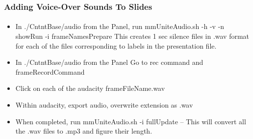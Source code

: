 \begin{comment}
*****  [[elisp:(org-cycle)][| ]]  [[elisp:(blee:ppmm:org-mode-toggle)][Nat]] [[elisp:(beginning-of-buffer)][Top]] [[elisp:(delete-other-windows)][(1)]] || /Frame/ *Label=AddingVoice-OverSoundsToSlides*  Adding Voice-Over Sounds To Slides ::  [[elisp:(org-cycle)][| ]]
\end{comment}

\begin{frame}[fragile,label=AddingVoice-OverSoundsToSlides]
    \frametitle{Adding Voice-Over Sounds To Slides}
    \framesubtitle{}

\begin{itemize}
\item In ./CntntBase/audio from the Panel, run  mmUniteAudio.sh -h -v -n showRun -i frameNamesPrepare
  This creates 1 sec silence files in .wav format for each of the files corresponding to labels
  in the presentation file.
\item In ./CntntBase/audio from the Panel Go to rec command and frameRecordCommand
\item Click on each of the audacity frameFileName.wav
\item Within audacity, export audio, overwrite extension as .wav
\item When completed, run  mmUniteAudio.sh -i fullUpdate -- This will convert all the .wav files to .mp3 and 
  figure their length.
\end{itemize}

\end{frame}

\begin{comment}
*      ================
*  [[elisp:(org-cycle)][| ]] [[elisp:(org-show-subtree)][|=]] [[elisp:(show-children 10)][|V]] [[elisp:(bx:orgm:indirectBufOther)][|>]] [[elisp:(bx:orgm:indirectBufMain)][|I]] [[elisp:(blee:ppmm:org-mode-toggle)][|N]] [[elisp:(org-top-overview)][|O]] [[elisp:(progn (org-shifttab) (org-content))][|C]] [[elisp:(delete-other-windows)][|1]]  *Part 0*   /Creating And Adding Videos And Screen Captures/ ::  [[elisp:(org-cycle)][| ]]
\end{comment}

